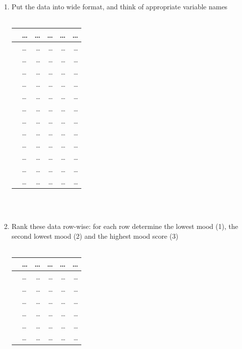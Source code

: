 \documentclass[]{report}\usepackage[]{graphicx}\usepackage[]{color}
\begin{document}
\begin{enumerate}

\item Put the data into wide format, and think of appropriate variable names
\\
 \\
 \begin{tabular}{llrrrr}
   & \dots & \dots  & \dots & \dots  & \dots  \\ \hline
  & \dots & \dots  & \dots & \dots  & \dots  \\
  & \dots & \dots  & \dots & \dots  & \dots  \\
  & \dots & \dots  & \dots & \dots  & \dots  \\
  & \dots & \dots  & \dots & \dots  & \dots  \\
  & \dots & \dots  & \dots & \dots  & \dots  \\
  & \dots & \dots  & \dots & \dots  & \dots  \\
  & \dots & \dots  & \dots & \dots  & \dots  \\
  & \dots & \dots  & \dots & \dots  & \dots  \\
  & \dots & \dots  & \dots & \dots  & \dots  \\
  & \dots & \dots  & \dots & \dots  & \dots  \\
  & \dots & \dots  & \dots & \dots  & \dots  \\
  & \dots & \dots  & \dots & \dots  & \dots  \\
 \end{tabular}
\\
\\
\item Rank these data row-wise: for each row determine the lowest mood (1), the second lowest mood (2) and the highest mood score (3)
\\
 \\
 \begin{tabular}{llrrrr}
   & \dots & \dots  & \dots & \dots  & \dots  \\ \hline
  & \dots & \dots  & \dots & \dots  & \dots  \\
  & \dots & \dots  & \dots & \dots  & \dots  \\
  & \dots & \dots  & \dots & \dots  & \dots  \\
  & \dots & \dots  & \dots & \dots  & \dots  \\
  & \dots & \dots  & \dots & \dots  & \dots  \\
  & \dots & \dots  & \dots & \dots  & \dots  \\

\end{tabular}
\end{enumerate}
\end{document}
